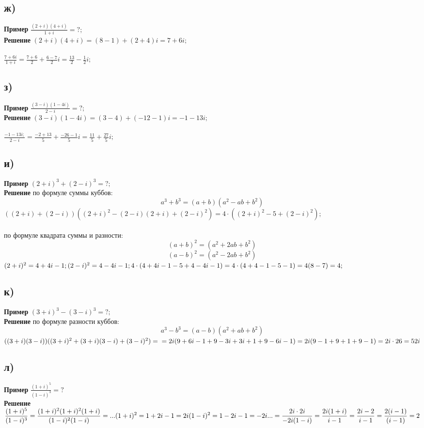 \documentclass[12pt]{article}
\begin{document}
\newpage
\subsection{ж)}
\textbf{Пример}
$
\displaystyle
\frac{(2+i)(4+i)}{1+i}=?;
$\\
\textbf{Решение}
$
(2+i)(4+i)=(8-1)+(2+4)i=7+6i;
$\\
\\
$
\displaystyle
\frac{7+6i}{1+i}=
\frac{7+6}{2}+
\frac{6-7}{2}i=
\frac{13}{2}-
\frac{1}{2}i;
$\\

\newpage
\subsection{з)}
\textbf{Пример}
$
\displaystyle
\frac{(3-i)(1-4i)}{2-i}=?;
$\\
\textbf{Решение}
$
(3-i)(1-4i)=(3-4)+(-12-1)i=-1-13i;
$\\
\\
$
\displaystyle
\frac{-1-13i;}{2-i}=
\frac{-2+13}{5}+
\frac{-26-1}{5}i=
\frac{11}{5}+
\frac{27}{5}i;
$

\newpage
\subsection{и)}
\textbf{Пример}
$
(2+i)^3+(2-i)^3=?;
$\\
\textbf{Решение}
по формуле суммы куббов:
$$
a^3+b^3=(a+b)(a^2-ab+b^2)
$$
$
((2+i)+(2-i))
(
(2+i)^2-(2-i)(2+i)+(2-i)^2
)=
4\cdot((2+i)^2-5+(2-i)^2);
$\\
\\
по формуле квадрата суммы и разности:
$$(a+b)^2=(a^2+2ab+b^2)$$
$$(a-b)^2=(a^2-2ab+b^2)$$
$
(2+i)^2 = 4+4i-1;\\
(2-i)^2 = 4-4i-1;\\
4\cdot(4+4i-1-5+4-4i-1)=4\cdot(4+4-1-5-1)=4(8-7)=4;
$\\

\newpage
\subsection{к)}
\textbf{Пример}
$
(3+i)^3-(3-i)^3=?;
$\\
\textbf{Решение}
по формуле разности куббов:
$$
a^3-b^3=(a-b)(a^2+ab+b^2)
$$
$
((3+i)(3-i))
((3+i)^2+(3+i)(3-i)+(3-i)^2)=\\
=2i(9+6i-1+9-3i+3i+1+9-6i-1)=
2i(9-1+9+1+9-1)=
2i\cdot26=
52i
$

\newpage
\subsection{л)}
\textbf{Пример}
$
\displaystyle
\frac{(1+i)^5}{(1-i)^3}=?
$\\
\textbf{Решение}
$
\displaystyle
\frac{(1+i)^5}{(1-i)^3}=
\frac{(1+i)^2(1+i)^2(1+i)}{(1-i)^2(1-i)}=...
\\
\\
(1+i)^2 = 1+2i-1=2i\\
(1-i)^2 = 1-2i-1=-2i\\
\\
...=\frac{2i\cdot2i}{-2i(1-i)}=
\frac{2i(1+i)}{i-1}=
\frac{2i-2}{i-1}=
\frac{2(i-1)}{(i-1)}=2
$
\end{document}
